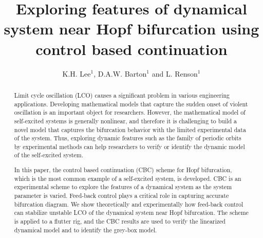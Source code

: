 \documentclass[openacc]{rsproca_new}%
\begin{document}



\title{Exploring features of dynamical system near Hopf bifurcation using control based continuation}

\author{%
K.H. Lee$^{1}$, D.A.W. Barton$^{1}$ and L. Renson$^{1}$}

\address{$^{1}$Department of Engineering Mathematics, University of Bristol\\}

\subject{mechanical engineering, differential equations}



\begin{abstract}
 Limit cycle oscillation (LCO) causes a significant problem in various engineering applications. Developing mathematical models that capture the sudden onset of violent oscillation is an important object for researchers. However, the mathematical model of self-excited systems is generally nonlinear, and therefore it is challenging to build a novel model that captures the bifurcation behavior with the limited experimental data of the system. Thus, exploring dynamic features such as the family of periodic orbits by experimental methods can help researchers to verify or identify the dynamic model of the self-excited system.

 In this paper, the control based continuation (CBC) scheme for Hopf bifurcation, which is the most common example of a self-excited system, is developed. CBC is an experimental scheme to explore the features of a dynamical system as the system parameter is varied. Feed-back control plays a critical role in capturing accurate bifurcation diagram. We show theoretically and experimentally how feed-back control can stabilize unstable LCO of the dynamical system near Hopf bifurcation. The scheme is applied to a flutter rig, and the CBC results are used to verify the linearized dynamical model and to identify the grey-box model.
\end{abstract}
\end{document}
